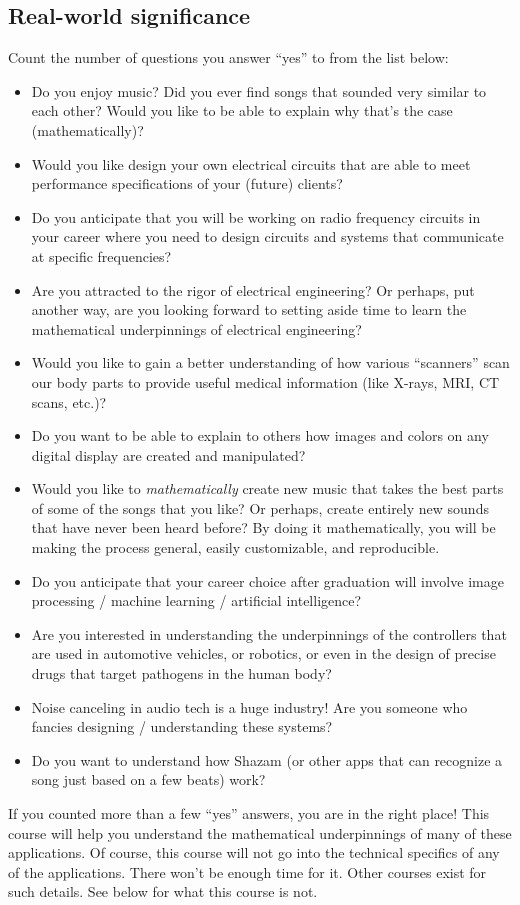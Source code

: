 \subsection{Real-world significance}
Count the number of questions you answer ``yes'' to from the list below:
\begin{itemize}
  \item Do you enjoy music? Did you ever find songs that sounded very similar to each other? Would you like to be able to explain why that's the case (mathematically)?
  \item Would you like design your own electrical circuits that are able to meet performance specifications of your (future) clients?
  \item Do you anticipate that you will be working on radio frequency circuits in your career where you need to design circuits and systems that communicate at specific frequencies?
  \item Are you attracted to the rigor of electrical engineering? Or perhaps, put another way, are you looking forward to setting aside time to learn the mathematical underpinnings of electrical engineering?
  \item Would you like to gain a better understanding of how various ``scanners'' scan our body parts to provide useful medical information (like X-rays, MRI, CT scans, etc.)?
  \item Do you want to be able to explain to others how images and colors on any digital display are created and manipulated?
  \item Would you like to \emph{mathematically} create new music that takes the best parts of some of the songs that you like? Or perhaps, create entirely new sounds that have never been heard before? By doing it mathematically, you will be making the process general, easily customizable, and reproducible.
  \item Do you anticipate that your career choice after graduation will involve image processing / machine learning / artificial intelligence?
  \item Are you interested in understanding the underpinnings of the controllers that are used in automotive vehicles, or robotics, or even in the design of precise drugs that target pathogens in the human body?
  \item Noise canceling in audio tech is a huge industry! Are you someone who fancies designing / understanding these systems?
  \item Do you want to understand how Shazam (or other apps that can recognize a song just based on a few beats) work?
\end{itemize}
If you counted more than a few ``yes'' answers, you are in the right place! This course will help you understand the mathematical underpinnings of many of these applications. Of course, this course will not go into the technical specifics of any of the applications. There won't be enough time for it. Other courses exist for such details. See below for what this course is not.
